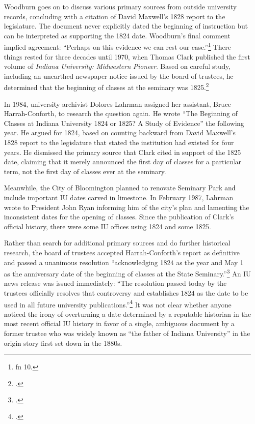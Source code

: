 \documentclass[
  american,
  letterpaper,
]{scrreprt}
\begin{document}
Woodburn goes on to discuss various primary sources from outside
university records, concluding with a citation of David Maxwell's 1828
report to the legislature. The document never explicitly dated the
beginning of instruction but can be interpreted as supporting the 1824
date. Woodburn's final comment implied agreement: ``Perhaps on this
evidence we can rest our case.''\footnote{
  fn 10.} There things rested for three decades until 1970, when Thomas
Clark published the first volume of \emph{Indiana University: Midwestern
Pioneer}. Based on careful study, including an unearthed newspaper
notice issued by the board of trustees, he determined that the beginning
of classes at the seminary was 1825.\footnote{.}

In 1984, university archivist Dolores Lahrman assigned her assistant,
Bruce Harrah-Conforth, to research the question again. He wrote ``The
Beginning of Classes at Indiana University 1824 or 1825? A Study of
Evidence'' the following year. He argued for 1824, based on counting
backward from David Maxwell's 1828 report to the legislature that stated
the institution had existed for four years. He dismissed the primary
source that Clark cited in support of the 1825 date, claiming that it
merely announced the first day of classes for a particular term, not the
first day of classes ever at the seminary.

Meanwhile, the City of Bloomington planned to renovate Seminary Park and
include important IU dates carved in limestone. In February 1987,
Lahrman wrote to President John Ryan informing him of the city's plan
and lamenting the inconsistent dates for the opening of classes. Since
the publication of Clark's official history, there were some IU offices
using 1824 and some 1825.

Rather than search for additional primary sources and do further
historical research, the board of trustees accepted Harrah-Conforth's
report as definitive and passed a unanimous resolution ``acknowledging
1824 as the year and May 1 as the anniversary date of the beginning of
classes at the State Seminary.''\footnote{.}
An IU news release was issued immediately: ``The resolution passed today
by the trustees officially resolves that controversy and establishes
1824 as the date to be used in all future university
publications.''\footnote{.} It was not clear whether anyone noticed the irony of
overturning a date determined by a reputable historian in the most
recent official IU history in favor of a single, ambiguous document by a
former trustee who was widely known as ``the father of Indiana
University'' in the origin story first set down in the 1880s.
\end{document}
